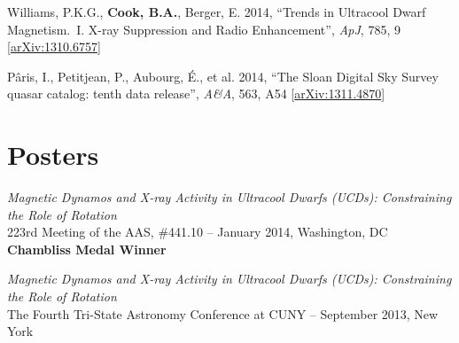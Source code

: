 \documentclass{res}
\begin{document}
\begin{resume}
Williams, P.K.G., \textbf{Cook, B.A.}, Berger, E. 2014, ``Trends in
Ultracool Dwarf Magnetism.~I. X-ray Suppression and Radio
Enhancement'', \textit{ApJ}, 785, 9
[\href{http://arxiv.org/abs/1310.6757}{arXiv:1310.6757}]

P\^{a}ris, I., Petitjean, P., Aubourg, \'E., et al. 2014, ``The Sloan
Digital Sky Survey quasar catalog: tenth data release'',
\textit{A\&A}, 563, A54
       [\href{http://arxiv.org/abs/1311.4870}{arXiv:1311.4870}]

\section{\textbf{Posters}}
\vspace{.1in}
\textit{Magnetic Dynamos and X-ray Activity in Ultracool Dwarfs (UCDs):
Constraining the Role of Rotation}\\ 223rd Meeting of the AAS,
\#441.10 -- January 2014, Washington, DC \\ \textbf{Chambliss Medal
  Winner}

\textit{Magnetic Dynamos and X-ray Activity in Ultracool Dwarfs
  (UCDs): Constraining the Role of Rotation}\\ The Fourth Tri-State
Astronomy Conference at CUNY -- September 2013, New York


\end{resume}
\end{document}
